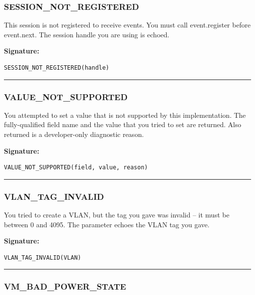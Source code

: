 \subsubsection{SESSION\_NOT\_REGISTERED}

This session is not registered to receive events.  You must call
event.register before event.next.  The session handle you are using is
echoed.

\vspace{0.3cm}
{\bf Signature:}
\begin{verbatim}SESSION_NOT_REGISTERED(handle)\end{verbatim}
\begin{center}\rule{10em}{0.1pt}\end{center}

\subsubsection{VALUE\_NOT\_SUPPORTED}

You attempted to set a value that is not supported by this implementation. 
The fully-qualified field name and the value that you tried to set are
returned.  Also returned is a developer-only diagnostic reason.

\vspace{0.3cm}
{\bf Signature:}
\begin{verbatim}VALUE_NOT_SUPPORTED(field, value, reason)\end{verbatim}
\begin{center}\rule{10em}{0.1pt}\end{center}

\subsubsection{VLAN\_TAG\_INVALID}

You tried to create a VLAN, but the tag you gave was invalid -- it must be
between 0 and 4095.  The parameter echoes the VLAN tag you gave.

\vspace{0.3cm}
{\bf Signature:}
\begin{verbatim}VLAN_TAG_INVALID(VLAN)\end{verbatim}
\begin{center}\rule{10em}{0.1pt}\end{center}

\subsubsection{VM\_BAD\_POWER\_STATE}

